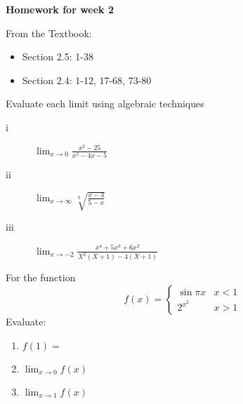 \documentclass[12pt]{article}
\newenvironment{problem}[2][Problem]{\begin{trivlist}
\item[\hskip \labelsep {\bfseries #1}\hskip \labelsep {\bfseries #2.}]}{\end{trivlist}}
\newenvironment{sol}
    {\emph{Solution:}
    }
    {
    \qed
    }
\begin{document}

{\bf Homework for week 2}

From the Textbook:

\begin{itemize}
\item Section 2.5: 1-38
\item Section 2.4: 1-12, 17-68, 73-80
\end{itemize}


\begin{problem}{1}
  Evaluate each limit using algebraic techniques
  \begin{description}
  \item[i] $\displaystyle \lim_{x\rightarrow 0} \frac{x^2-25}{x^2-4x-5}$
  \item[ii] $\displaystyle \lim_{x\rightarrow \infty} \sqrt[3]{\frac{x-3}{5-x}}$
  \item[iii] $\displaystyle \lim_{x\rightarrow -2}\frac{x^4+5x^3+6x^2}{X^2(X+1)-4(X+1)}$
  \end{description}
\end{problem}



\begin{problem}{2}
  For the function
  $$
 f(x) = \begin{cases}
    \sin{\pi x} & x< 1 \\
      2^{x^2}    & x > 1
  \end{cases}
 $$
 Evaluate:
  \begin{enumerate}[label=\roman*)]
  \item $f(1) =$
  \item $\displaystyle \lim_{x\rightarrow 0} f(x)$
  \item $\displaystyle \lim_{x\rightarrow 1} f(x)$
  \end{enumerate}
\end{problem}
\end{document}
